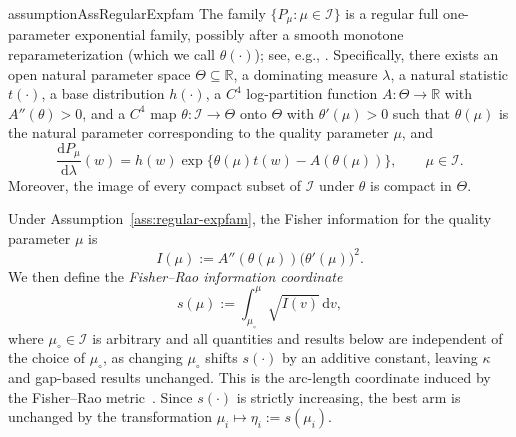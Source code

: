 \documentclass[10pt]{article}
\newcommand{\dd}{\mathrm{d}}
\theoremstyle{plain}
\begin{document}

\begin{restatable}{assumption}{AssRegularExpfam}
\label{ass:regular-expfam}
The family \(\{P_\mu: \mu\in\mathcal I\}\) is a regular full
one-parameter exponential family, possibly after a smooth monotone
reparameterization (which we call $\theta(\cdot)$); see, e.g., \cite[Sec.~34.3.1]{banditAlg}. Specifically,
there exists an open natural parameter space
\(\Theta\subseteq\mathbb R\), a dominating measure \(\lambda\), a natural
statistic \(t(\cdot)\), a base distribution \(h(\cdot)\), a \(C^4\) log-partition function
\(A:\Theta\to\mathbb R\) with $A''(\theta)>0$, and a \(C^4\) map
\(\theta:\mathcal I\to\Theta\) onto $\Theta$ with $\theta'(\mu)>0$ such that \(\theta(\mu)\) is the natural
parameter corresponding to the quality parameter \(\mu\), and
\[
    \frac{\dd P_\mu}{\dd \lambda}(w)
    =
    h(w)\exp\big\{
        \theta(\mu)t(w)-A(\theta(\mu))
    \big\},
    \qquad \mu\in\mathcal I .
\]
Moreover,
the image of every compact subset of $\mathcal I$ under
$\theta$ is compact in \(\Theta\).
\end{restatable}
Under Assumption~\ref{ass:regular-expfam}, the Fisher information for the
quality parameter \(\mu\) is
\[
    I(\mu)
    :=
    A''(\theta(\mu))\big(\theta'(\mu)\big)^2 .
\]
We then define the \emph{Fisher--Rao information coordinate}
\begin{equation}
    s(\mu)
    :=
    \int_{\mu_\circ}^{\mu}\sqrt{I(v)}\,\dd v, \label{eqn:fisher_rao}    
\end{equation}
where \(\mu_\circ\in\mathcal I\) is arbitrary and all quantities and results below are independent of the choice of \(\mu_\circ\), as changing $\mu_\circ$ shifts $s(\cdot)$ by an additive constant, leaving $\kappa$ and gap-based results unchanged.
This is the arc-length coordinate induced by the
Fisher--Rao metric~\citep{Rao1992,amari2000methods}.
 Since \(s(\cdot)\) is strictly
increasing, the best arm is unchanged by the transformation
\(\mu_i\mapsto \eta_i:=s(\mu_i)\).
\end{document}
